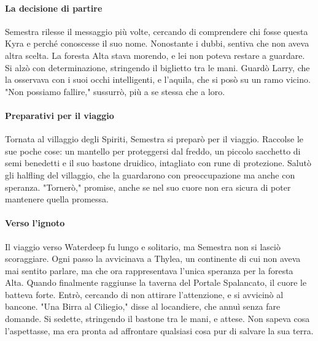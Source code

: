 \documentclass[letterpaper,twocolumn,openany,nodeprecatedcode]{dndbook}
\begin{document}
\paragraph{La decisione di partire}  
Semestra rilesse il messaggio più volte, cercando di comprendere chi fosse questa Kyra e perché conoscesse il suo nome. Nonostante i dubbi, sentiva che non aveva altra scelta. La foresta Alta stava morendo, e lei non poteva restare a guardare. Si alzò con determinazione, stringendo il biglietto tra le mani. Guardò Larry, che la osservava con i suoi occhi intelligenti, e l’aquila, che si posò su un ramo vicino. "Non possiamo fallire," sussurrò, più a se stessa che a loro.

\paragraph{Preparativi per il viaggio}  
Tornata al villaggio degli Spiriti, Semestra si preparò per il viaggio. Raccolse le sue poche cose: un mantello per proteggersi dal freddo, un piccolo sacchetto di semi benedetti e il suo bastone druidico, intagliato con rune di protezione. Salutò gli halfling del villaggio, che la guardarono con preoccupazione ma anche con speranza. "Tornerò," promise, anche se nel suo cuore non era sicura di poter mantenere quella promessa.

\paragraph{Verso l’ignoto}  
Il viaggio verso Waterdeep fu lungo e solitario, ma Semestra non si lasciò scoraggiare. Ogni passo la avvicinava a Thylea, un continente di cui non aveva mai sentito parlare, ma che ora rappresentava l’unica speranza per la foresta Alta. Quando finalmente raggiunse la taverna del Portale Spalancato, il cuore le batteva forte. Entrò, cercando di non attirare l’attenzione, e si avvicinò al bancone. "Una Birra al Ciliegio," disse al locandiere, che annuì senza fare domande. Si sedette, stringendo il bastone tra le mani, e attese. Non sapeva cosa l’aspettasse, ma era pronta ad affrontare qualsiasi cosa pur di salvare la sua terra.
\end{document}
